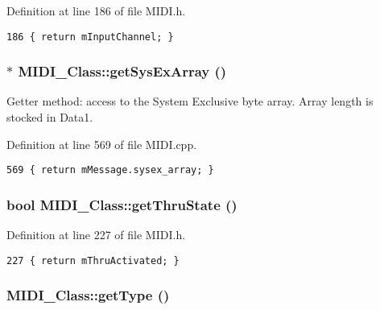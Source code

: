 Definition at line 186 of file MIDI.h.

\begin{Code}\begin{verbatim}186 { return mInputChannel; }
\end{verbatim}
\end{Code}


\hypertarget{class_m_i_d_i___class_4540dd7720884677b50cff2f23d1982a}{
\subsubsection[{getSysExArray}]{ $\ast$ MIDI\_\-Class::getSysExArray ()}}
\label{class_m_i_d_i___class_4540dd7720884677b50cff2f23d1982a}


Getter method: access to the System Exclusive byte array. Array length is stocked in Data1. 

Definition at line 569 of file MIDI.cpp.

\begin{Code}\begin{verbatim}569 { return mMessage.sysex_array; }
\end{verbatim}
\end{Code}


\hypertarget{class_m_i_d_i___class_76c71d380b9221207062aa669a9c0005}{
\subsubsection[{getThruState}]{\setlength{\rightskip}{0pt plus 5cm}bool MIDI\_\-Class::getThruState ()}}
\label{class_m_i_d_i___class_76c71d380b9221207062aa669a9c0005}




Definition at line 227 of file MIDI.h.

\begin{Code}\begin{verbatim}227 { return mThruActivated; }
\end{verbatim}
\end{Code}


\hypertarget{class_m_i_d_i___class_b43d8c2b277cf2408865b4f63111080b}{
\subsubsection[{getType}]{ MIDI\_\-Class::getType ()}}
\label{class_m_i_d_i___class_b43d8c2b277cf2408865b4f63111080b}


